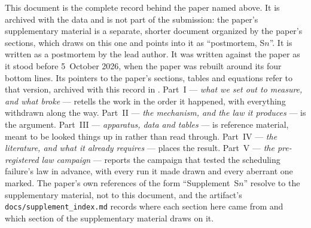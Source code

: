 \documentclass[10pt,journal,onecolumn]{IEEEtran}
\begin{document}
This document is the complete record behind the paper named above. It is archived with the
data and is not part of the submission: the paper's supplementary material is a separate,
shorter document organized by the paper's sections, which draws on this one and points into it
as ``postmortem, S$n$''. It is written as a postmortem by the lead author. It was written
against the paper as it stood before 5~October 2026, when the paper was rebuilt around its
four bottom lines. Its pointers to the paper's sections, tables and equations refer to that
version, archived with this record in .
Part~I --- \emph{what we set out to measure, and what broke} --- retells the work in the
order it happened, with everything withdrawn along the way. Part~II --- \emph{the
mechanism, and the law it produces} --- is the argument. Part~III --- \emph{apparatus,
data and tables} --- is reference material, meant to be looked things up in rather than
read through. Part~IV --- \emph{the literature, and what it already requires} --- places
the result. Part~V --- \emph{the pre-registered law campaign} --- reports the campaign that
tested the scheduling failure's law in advance, with every run it made drawn and every aberrant
one marked. The paper's own references of the form ``Supplement~S$n$'' resolve to the
supplementary material, not to this document, and the artifact's
\texttt{docs/supplement\_index.md} records where each section here came from and which section
of the supplementary material draws on it.

\tableofcontents
\listoffigures
\listoftables
\bigskip
\end{document}

